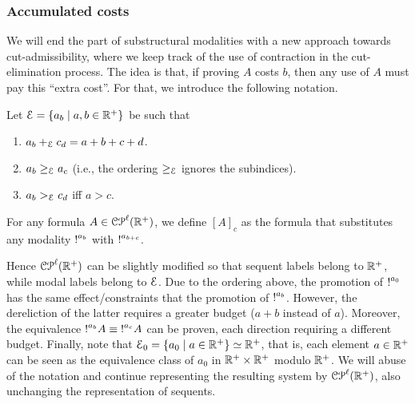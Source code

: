 \subsubsection{Accumulated costs}
We will end the part of substructural modalities with a new approach towards cut-admissibility, where  we keep track of the use of contraction in the cut-elimination process.  
The idea is that, if proving $A$ costs $b$, then any use of $A$  
must pay this ``extra cost''. For that, we introduce the following notation.

\begin{definition}
Let $\mathcal{E}=\{a_b\mid a,b\in \mathbb{R^+}\}$ be such that 
\begin{enumerate}
\item $a_b+_{\mathcal{E}} c_d=a+b+c+d$.
\item $a_b \geq_{\mathcal{E}} a_c$ (i.e., the ordering $\geq_{\mathcal{E}}$ ignores the subindices).
\item $a_b >_{\mathcal{E}} c_d$ iff $a>c$.
\end{enumerate}
For any formula $A\in\mathcal{CP}^\ell(\mathbb{R}^{+})$, we define $[A]_c$ as the formula that substitutes any 
modality $\hbox{$\mathop{!}^{a_b}$}{}$ with $\hbox{$\mathop{!}^{a_{b+c}}$}$.
\end{definition}
Hence $\mathcal{CP}^\ell(\mathbb{R}^{+})$ can be slightly modified so that sequent labels belong to  $\mathbb{R^+}$, while modal labels belong to $\mathcal{E}$. Due to the ordering above, the promotion of $\hbox{$\mathop{!}^{a_0}$}$ 
has the same effect/constraints that the promotion of $\hbox{$\mathop{!}^{a_b}$}$. However, the dereliction of the latter requires a greater budget ($a+b$ instead of $a$). Moreover, the equivalence $\hbox{$\mathop{!}^{a_b}$}A \equiv \hbox{$\mathop{!}^{a_c}$}A$ can be proven, each direction requiring a different budget.
Finally, note that $\mathcal{E}_0=\{a_0\mid a\in \mathbb{R^+}\}\simeq \mathbb{R^+}$, that is, each element $a\in\mathbb{R^+}$ can be seen as the equivalence class of $a_0$ in $\mathbb{R^+}\times \mathbb{R^+}$ modulo $\mathbb{R^+}$.
We will abuse of the notation and continue representing the resulting system by $\mathcal{CP}^\ell(\mathbb{R}^{+})$, also unchanging the representation of sequents. 



